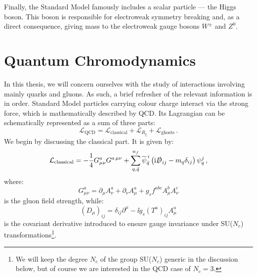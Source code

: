 \documentclass[main.tex]{subfiles}
\begin{document}
Finally, the Standard Model famously includes a scalar particle --- the Higgs boson. This boson is responsible for electroweak symmetry breaking and, as a direct consequence, giving mass to the electroweak gauge bosons $W^\pm$ and $Z^0$. 
\section{Quantum Chromodynamics} \label{sec:QCD}
In this thesis, we will concern ourselves with the study of interactions involving mainly quarks and gluons. As such, a brief refresher of the relevant information is in order. Standard Model particles carrying colour charge interact via the strong force, which is mathematically described by QCD. Its Lagrangian can be schematically represented as a sum of three parts:
\begin{equation}
    \mathcal{L}_{\text{QCD}} = \mathcal{L}_{\text{classical}} + \mathcal{L}_{R_\xi} + \mathcal{L}_{\text{ghosts}}\,.
\end{equation}
We begin by discussing the classical part. It is given by:
\begin{equation} \label{eq:QCDLagrangian}
    \mathcal{L}_{\text{classical}} = -\frac{1}{4} G^a_{\mu\nu} G^{a\,\mu\nu} + \sum_{q,\bar{q}}^{n_f} \overline{\psi}_{\bar{q}}^{\,i} \left(\mathrm{i} \slashed{D}_{ij} - m_q \delta_{ij} \right) \psi_q^j\,,
\end{equation}
where:
\begin{equation}
     G^a_{\mu\nu} = \partial_\mu A^a_\nu + \partial_\nu A^a_\mu + g_s f^{abc} A^b_\mu A^c_\nu
\end{equation}
is the gluon field strength, while:
\begin{equation}
    (D_\mu)_{ij} = \delta_{ij} \partial^\mu - \ii g_s (T^a)_{ij} A^a_\mu
\end{equation}
is the covariant derivative introduced to ensure gauge invariance under SU($N_c$) transformations\footnote{We will keep the degree $N_c$ of the group SU($N_c$) generic in the discussion below, but of course we are interested in the QCD case of $N_c=3$.}.
\end{document}
